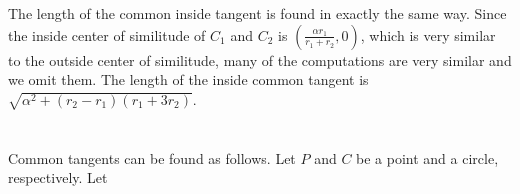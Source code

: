 The length of the common inside tangent is found in exactly the same way.
Since the inside center of similitude of $C_{1}$ and $C_{2}$ is 
$(\frac{\alpha r_{1}}{r_{1} + r_{2}}, 0)$, which is very similar to the
outside center of similitude, many of the computations are very similar
and we omit them.
The length of the inside common tangent is 
$\sqrt{\alpha^{2} + (r_{2} - r_{1})(r_{1} + 3r_{2})}$.
\QED


\section{}

Common tangents can be found as follows.
Let $P$ and $C$ be a point and a circle, respectively.
Let 

